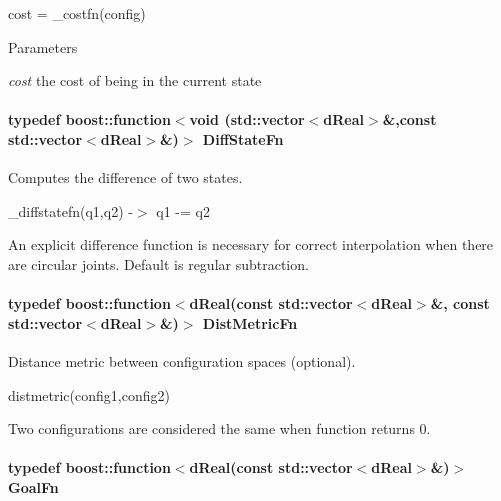 cost = \_\-costfn(config) 
\begin{DoxyParams}{Parameters}
\item[{\em cost}]the cost of being in the current state \end{DoxyParams}
\hypertarget{classOpenRAVE_1_1PlannerBase_1_1PlannerParameters_a58f093aece5495e4be24da19e9cb4cc7}{
\paragraph[{DiffStateFn}]{\setlength{\rightskip}{0pt plus 5cm}typedef boost::function$<$void (std::vector$<$dReal$>$\&,const std::vector$<$dReal$>$\&)$>$ {\bf DiffStateFn}}\hfill}
\label{classOpenRAVE_1_1PlannerBase_1_1PlannerParameters_a58f093aece5495e4be24da19e9cb4cc7}


Computes the difference of two states. 

\_\-diffstatefn(q1,q2) -\/$>$ q1 -\/= q2

An explicit difference function is necessary for correct interpolation when there are circular joints. Default is regular subtraction. \hypertarget{classOpenRAVE_1_1PlannerBase_1_1PlannerParameters_a1e96b9c9b49635f5bfd32531e41fb0e8}{
\paragraph[{DistMetricFn}]{\setlength{\rightskip}{0pt plus 5cm}typedef boost::function$<$dReal(const std::vector$<$dReal$>$\&, const std::vector$<$dReal$>$\&)$>$ {\bf DistMetricFn}}\hfill}
\label{classOpenRAVE_1_1PlannerBase_1_1PlannerParameters_a1e96b9c9b49635f5bfd32531e41fb0e8}


Distance metric between configuration spaces (optional). 

distmetric(config1,config2)

Two configurations are considered the same when function returns 0. \hypertarget{classOpenRAVE_1_1PlannerBase_1_1PlannerParameters_ac6a5c6b1eb0d15f3cd0f69f8d4871df3}{
\paragraph[{GoalFn}]{\setlength{\rightskip}{0pt plus 5cm}typedef boost::function$<$dReal(const std::vector$<$dReal$>$\&)$>$ {\bf GoalFn}}\hfill}
\label{classOpenRAVE_1_1PlannerBase_1_1PlannerParameters_ac6a5c6b1eb0d15f3cd0f69f8d4871df3}


